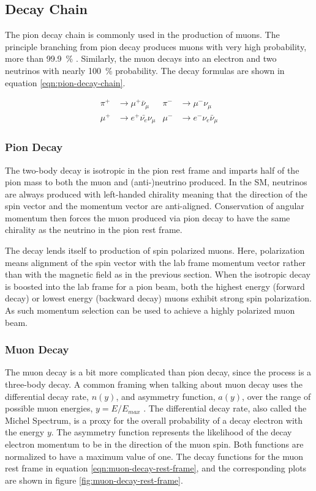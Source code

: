 \subsection{Decay Chain}

The pion decay chain is commonly used in the production of muons.  The principle branching from pion decay produces muons with very high probability, more than \SI{99.9}{\percent} \cite{pdg-2016}.  Similarly, the muon decays into an electron and two neutrinos with nearly \SI{100}{\percent} probability.  The decay formulas are shown in equation \ref{eqn:pion-decay-chain}.

\begin{align}
\label{eqn:pion-decay-chain}
\pi^+ & \rightarrow \mu^+ \bar{\nu}_\mu  & \pi^- & \rightarrow \mu^- \nu_\mu \\
\mu^+ & \rightarrow e^+ \bar{\nu_e} \nu_\mu  & \mu^- & \rightarrow e^- \nu_e \bar{\nu}_\mu 
\end{align}

\subsubsection{Pion Decay}

The two-body decay is isotropic in the pion rest frame and imparts half of the pion mass to both the muon and (anti-)neutrino produced.  In the SM, neutrinos are always produced with left-handed chirality meaning that the direction of the spin vector and the momentum vector are anti-aligned.  Conservation of angular momentum then forces the muon produced via pion decay to have the same chirality as the neutrino in the pion rest frame.  

The decay lends itself to production of spin polarized muons.  Here, polarization means alignment of the spin vector with the lab frame momentum vector rather than with the magnetic field as in the previous section.  When the isotropic decay is boosted into the lab frame for a pion beam, both the highest energy (forward decay) or lowest energy (backward decay) muons exhibit strong spin polarization.  As such momentum selection can be used to achieve a highly polarized muon beam. 

\subsubsection{Muon Decay}

The muon decay is a bit more complicated than pion decay, since the process is a three-body decay.  A common framing when talking about muon decay uses the differential decay rate, $n(y)$, and asymmetry function, $a(y)$, over the range of possible muon energies, $y=E/E_{max}$ \cite{e989-tdr}.  The differential decay rate, also called the Michel Spectrum, is a proxy for the overall probability of a decay electron with the energy $y$.  The asymmetry function represents the likelihood of the decay electron momentum to be in the direction of the muon spin.  Both functions are normalized to have a maximum value of one.  The decay functions for the muon rest frame in equation \ref{eqn:muon-decay-rest-frame}, and the corresponding plots are shown in figure \ref{fig:muon-decay-rest-frame}.

